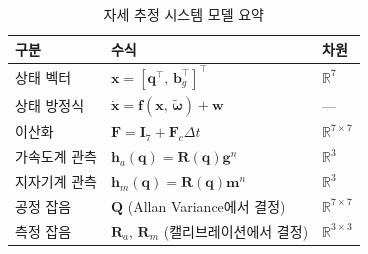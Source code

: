                \begin{table}[H]
                    \centering
                    \caption{자세 추정 시스템 모델 요약}
                    \label{tab:system_model_summary}
                    \begin{tabular}{lll}
                        \toprule
                        구분 & 수식 & 차원 \\
                        \midrule
                        상태 벡터 & $\mathbf{x} = [\mathbf{q}^\top,\, \mathbf{b}_g^\top]^\top$ & $\mathbb{R}^7$ \\
                        상태 방정식 & $\dot{\mathbf{x}} = \mathbf{f}(\mathbf{x},\, \tilde{\boldsymbol{\omega}}) + \mathbf{w}$ & --- \\
                        이산화 & $\mathbf{F} = \mathbf{I}_7 + \mathbf{F}_c \Delta t$ & $\mathbb{R}^{7\times 7}$ \\
                        가속도계 관측 & $\mathbf{h}_a(\mathbf{q}) = \mathbf{R}(\mathbf{q})\mathbf{g}^n$ & $\mathbb{R}^3$ \\
                        지자기계 관측 & $\mathbf{h}_m(\mathbf{q}) = \mathbf{R}(\mathbf{q})\mathbf{m}^n$ & $\mathbb{R}^3$ \\
                        공정 잡음 & $\mathbf{Q}$ (Allan Variance에서 결정) & $\mathbb{R}^{7\times 7}$ \\
                        측정 잡음 & $\mathbf{R}_a,\, \mathbf{R}_m$ (캘리브레이션에서 결정) & $\mathbb{R}^{3\times 3}$ \\
                        \bottomrule
                    \end{tabular}
                \end{table}